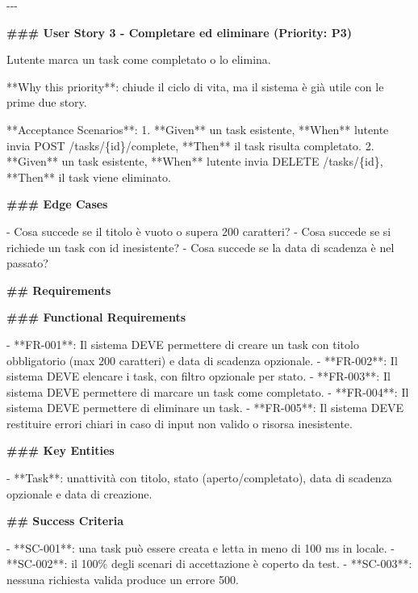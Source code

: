 \documentclass[
  italian,
  10pt,
]{book}
\newenvironment{Shaded}{\begin{snugshade}}{\end{snugshade}}
\newcommand{\FunctionTok}[1]{\textcolor[rgb]{0.13,0.29,0.53}{\textbf{#1}}}
\newcommand{\NormalTok}[1]{#1}
\newcommand{\SpecialStringTok}[1]{\textcolor[rgb]{0.31,0.60,0.02}{#1}}
\begin{document}
\begin{Shaded}
\begin{Highlighting}[]
\NormalTok{{-}{-}{-}}

\FunctionTok{\#\#\# User Story 3 {-} Completare ed eliminare (Priority: P3)}

\NormalTok{L\textquotesingle{}utente marca un task come completato o lo elimina.}

\NormalTok{**Why this priority**: chiude il ciclo di vita, ma il sistema è già utile}
\NormalTok{con le prime due story.}

\NormalTok{**Acceptance Scenarios**:}
\SpecialStringTok{1. }\NormalTok{**Given** un task esistente, **When** l\textquotesingle{}utente invia}
\NormalTok{   POST /tasks/\{id\}/complete, **Then** il task risulta completato.}
\SpecialStringTok{2. }\NormalTok{**Given** un task esistente, **When** l\textquotesingle{}utente invia}
\NormalTok{   DELETE /tasks/\{id\}, **Then** il task viene eliminato.}

\FunctionTok{\#\#\# Edge Cases}

\SpecialStringTok{{-} }\NormalTok{Cosa succede se il titolo è vuoto o supera 200 caratteri?}
\SpecialStringTok{{-} }\NormalTok{Cosa succede se si richiede un task con id inesistente?}
\SpecialStringTok{{-} }\NormalTok{Cosa succede se la data di scadenza è nel passato?}

\FunctionTok{\#\# Requirements}

\FunctionTok{\#\#\# Functional Requirements}

\SpecialStringTok{{-} }\NormalTok{**FR{-}001**: Il sistema DEVE permettere di creare un task con titolo}
\NormalTok{  obbligatorio (max 200 caratteri) e data di scadenza opzionale.}
\SpecialStringTok{{-} }\NormalTok{**FR{-}002**: Il sistema DEVE elencare i task, con filtro opzionale per stato.}
\SpecialStringTok{{-} }\NormalTok{**FR{-}003**: Il sistema DEVE permettere di marcare un task come completato.}
\SpecialStringTok{{-} }\NormalTok{**FR{-}004**: Il sistema DEVE permettere di eliminare un task.}
\SpecialStringTok{{-} }\NormalTok{**FR{-}005**: Il sistema DEVE restituire errori chiari in caso di input}
\NormalTok{  non valido o risorsa inesistente.}

\FunctionTok{\#\#\# Key Entities}

\SpecialStringTok{{-} }\NormalTok{**Task**: un\textquotesingle{}attività con titolo, stato (aperto/completato),}
\NormalTok{  data di scadenza opzionale e data di creazione.}

\FunctionTok{\#\# Success Criteria}

\SpecialStringTok{{-} }\NormalTok{**SC{-}001**: una task può essere creata e letta in meno di 100 ms in locale.}
\SpecialStringTok{{-} }\NormalTok{**SC{-}002**: il 100\% degli scenari di accettazione è coperto da test.}
\SpecialStringTok{{-} }\NormalTok{**SC{-}003**: nessuna richiesta valida produce un errore 500.}


\end{Highlighting}
\end{Shaded}
\end{document}
